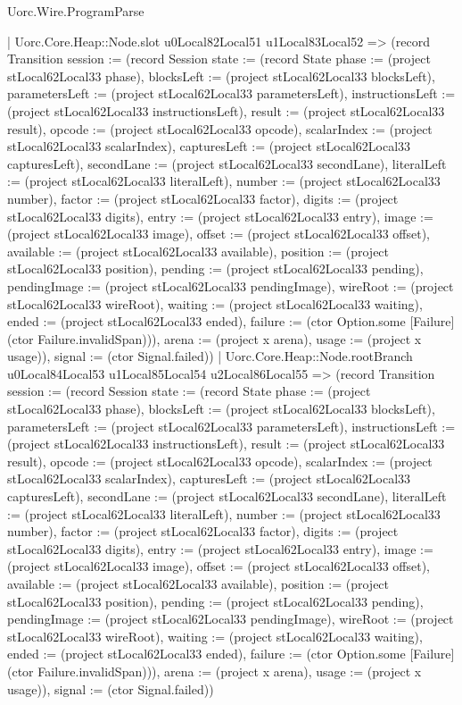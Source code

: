 \begin{lexlean}{Uorc.Wire.ProgramParse}
\begin{semanticmodule}
{        | Uorc.Core.Heap::Node.slot u0Local82Local51 u1Local83Local52 => (record Transition {session := (record Session {state := (record State {phase := (project stLocal62Local33 phase), blocksLeft := (project stLocal62Local33 blocksLeft), parametersLeft := (project stLocal62Local33 parametersLeft), instructionsLeft := (project stLocal62Local33 instructionsLeft), result := (project stLocal62Local33 result), opcode := (project stLocal62Local33 opcode), scalarIndex := (project stLocal62Local33 scalarIndex), capturesLeft := (project stLocal62Local33 capturesLeft), secondLane := (project stLocal62Local33 secondLane), literalLeft := (project stLocal62Local33 literalLeft), number := (project stLocal62Local33 number), factor := (project stLocal62Local33 factor), digits := (project stLocal62Local33 digits), entry := (project stLocal62Local33 entry), image := (project stLocal62Local33 image), offset := (project stLocal62Local33 offset), available := (project stLocal62Local33 available), position := (project stLocal62Local33 position), pending := (project stLocal62Local33 pending), pendingImage := (project stLocal62Local33 pendingImage), wireRoot := (project stLocal62Local33 wireRoot), waiting := (project stLocal62Local33 waiting), ended := (project stLocal62Local33 ended), failure := (ctor Option.some [Failure] (ctor Failure.invalidSpan))}), arena := (project x arena), usage := (project x usage)}), signal := (ctor Signal.failed)})
        | Uorc.Core.Heap::Node.rootBranch u0Local84Local53 u1Local85Local54 u2Local86Local55 => (record Transition {session := (record Session {state := (record State {phase := (project stLocal62Local33 phase), blocksLeft := (project stLocal62Local33 blocksLeft), parametersLeft := (project stLocal62Local33 parametersLeft), instructionsLeft := (project stLocal62Local33 instructionsLeft), result := (project stLocal62Local33 result), opcode := (project stLocal62Local33 opcode), scalarIndex := (project stLocal62Local33 scalarIndex), capturesLeft := (project stLocal62Local33 capturesLeft), secondLane := (project stLocal62Local33 secondLane), literalLeft := (project stLocal62Local33 literalLeft), number := (project stLocal62Local33 number), factor := (project stLocal62Local33 factor), digits := (project stLocal62Local33 digits), entry := (project stLocal62Local33 entry), image := (project stLocal62Local33 image), offset := (project stLocal62Local33 offset), available := (project stLocal62Local33 available), position := (project stLocal62Local33 position), pending := (project stLocal62Local33 pending), pendingImage := (project stLocal62Local33 pendingImage), wireRoot := (project stLocal62Local33 wireRoot), waiting := (project stLocal62Local33 waiting), ended := (project stLocal62Local33 ended), failure := (ctor Option.some [Failure] (ctor Failure.invalidSpan))}), arena := (project x arena), usage := (project x usage)}), signal := (ctor Signal.failed)})
}
\end{semanticmodule}
\end{lexlean}
